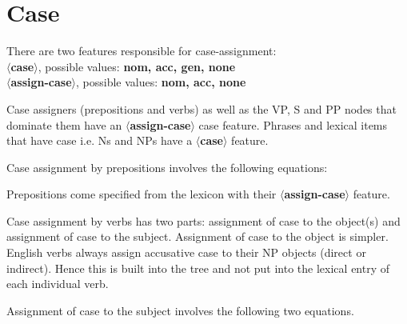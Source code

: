  
 
 
\section{Case} 
 
There are two features responsible for case-assignment:\\ 
{\bf $\langle$case$\rangle$}, possible values: {\bf nom, acc, gen, none}\\ 
{\bf $\langle$assign-case$\rangle$}, possible values: {\bf nom, acc, none} 
 
Case assigners (prepositions and verbs) as well as the VP, S and PP 
nodes that dominate them have an {\bf $\langle$assign-case$\rangle$} 
case feature. Phrases and lexical items that have case i.e. Ns and NPs 
have a {\bf $\langle$case$\rangle$} feature. 
 
Case assignment by prepositions involves the following equations: 
 
\beginsentences
{}\label{ex:195} 
\endsentences

 
 
\beginsentences
{}\label{ex:196} 
\endsentences

 
Prepositions come specified from the lexicon with their {\bf $\langle$assign-case$\rangle$} 
feature. 
 
\beginsentences
{}\label{ex:197} 
\endsentences

 
 
Case assignment by verbs has two parts: assignment of case to the 
object(s) and assignment of case to the subject. Assignment of case to 
the object is simpler.  English verbs always assign accusative case to 
their NP objects (direct or indirect).  Hence this is built into the 
tree and not put into the lexical entry of each individual verb. 
 
\beginsentences
{}\label{ex:198} 
\endsentences

 
Assignment of case to the subject involves the following two equations. 
 
\beginsentences
{}\label{ex:199} 
\endsentences

 
 
\beginsentences
{}\label{ex:200} 
\endsentences

